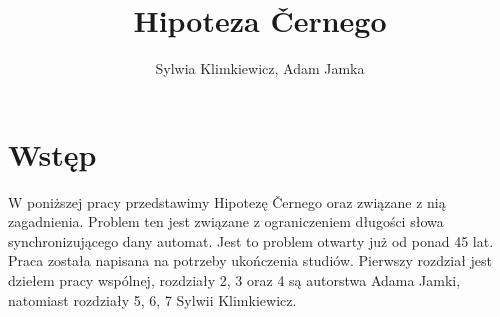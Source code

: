 \documentclass[12pt,a4paper]{article}
\begin{document}
\title{Hipoteza \v Cernego}
\author{Sylwia Klimkiewicz, Adam Jamka}
\maketitle

\section*{Wst\k{e}p}
W poni\.{z}szej pracy przedstawimy Hipotez\k{e} \v Cernego oraz zwi\k{a}zane z ni\k{a} zagadnienia. Problem ten jest zwi\k{a}zane z ograniczeniem d{\l}ugo\'{s}ci s{\l}owa synchronizuj\k{a}cego dany automat. Jest to problem otwarty ju\.{z} od ponad 45 lat. Praca zosta{\l}a napisana na potrzeby uko\'{n}czenia studi\'{o}w. Pierwszy rozdzia{\l} jest dzie{\l}em pracy wsp\'{o}lnej, rozdzia{\l}y 2, 3 oraz 4 s\k{a} autorstwa Adama Jamki, natomiast rozdzia{\l}y 5, 6, 7 Sylwii Klimkiewicz.

\end{document}
